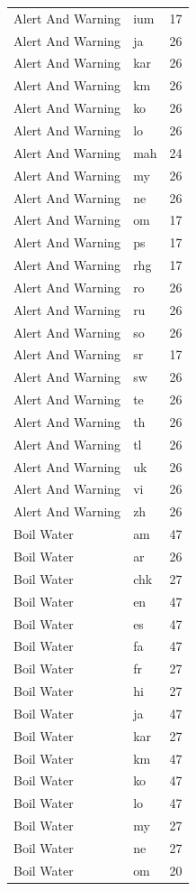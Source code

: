 \begin{longtable}{p{3cm} p{3cm} r}
Alert And Warning & ium & 17 \\
Alert And Warning & ja & 26 \\
Alert And Warning & kar & 26 \\
Alert And Warning & km & 26 \\
Alert And Warning & ko & 26 \\
Alert And Warning & lo & 26 \\
Alert And Warning & mah & 24 \\
Alert And Warning & my & 26 \\
Alert And Warning & ne & 26 \\
Alert And Warning & om & 17 \\
Alert And Warning & ps & 17 \\
Alert And Warning & rhg & 17 \\
Alert And Warning & ro & 26 \\
Alert And Warning & ru & 26 \\
Alert And Warning & so & 26 \\
Alert And Warning & sr & 17 \\
Alert And Warning & sw & 26 \\
Alert And Warning & te & 26 \\
Alert And Warning & th & 26 \\
Alert And Warning & tl & 26 \\
Alert And Warning & uk & 26 \\
Alert And Warning & vi & 26 \\
Alert And Warning & zh & 26 \\
Boil Water & am & 47 \\
Boil Water & ar & 26 \\
Boil Water & chk & 27 \\
Boil Water & en & 47 \\
Boil Water & es & 47 \\
Boil Water & fa & 47 \\
Boil Water & fr & 27 \\
Boil Water & hi & 27 \\
Boil Water & ja & 47 \\
Boil Water & kar & 27 \\
Boil Water & km & 47 \\
Boil Water & ko & 47 \\
Boil Water & lo & 47 \\
Boil Water & my & 27 \\
Boil Water & ne & 27 \\
Boil Water & om & 20 \\

\end{longtable}
